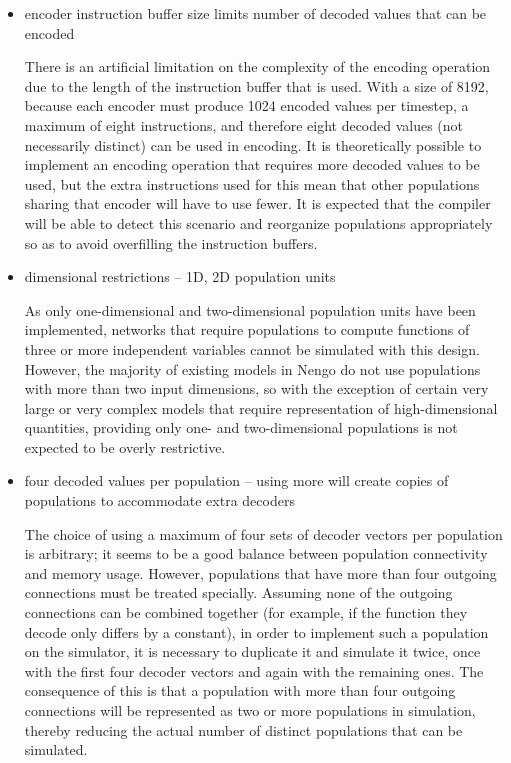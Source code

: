 \documentclass[english]{article}
\begin{document}
\begin{itemize}
\item encoder instruction buffer size limits number of decoded values that can be encoded

There is an artificial limitation on the complexity of the encoding operation due to the length of the instruction buffer that is used.
With a size of 8192,
because each encoder must produce 1024 encoded values per timestep, a maximum of eight instructions, and therefore eight decoded values
(not necessarily distinct)
can be used in encoding. It is theoretically possible to implement an encoding operation that requires more decoded values to be used,
but the extra instructions used for this mean that other populations sharing that encoder will have to use fewer.
It is expected that the compiler will be able to detect this scenario and reorganize populations appropriately so as to avoid overfilling the instruction buffers.
\item dimensional restrictions -- 1D, 2D population units

As only one-dimensional and two-dimensional population units have been implemented, networks that require populations to compute functions
of three or more independent variables cannot be simulated with this design.
However, the majority of existing models in Nengo do not use populations with more than two input dimensions, so with the exception of
certain very large or very complex models that require representation of high-dimensional quantities, providing only one- and two-dimensional
populations is not expected to be overly restrictive.

\item four decoded values per population -- using more will create copies of populations to accommodate extra decoders

The choice of using a maximum of four sets of decoder vectors per population is arbitrary; it seems to be a good balance between
population connectivity and memory usage. However, populations that have more than four outgoing connections must be treated specially.
Assuming none of the outgoing connections can be combined together (for example, if the function they decode only differs by a constant),
in order to implement such a population on the simulator, it is necessary to duplicate it and simulate it twice,
once with the first four decoder vectors and again with the remaining ones. The consequence of this is that a population with more than
four outgoing connections will be represented as two or more populations in simulation, thereby reducing the actual number of
distinct populations that can be simulated.
\end{itemize}
\end{document}
